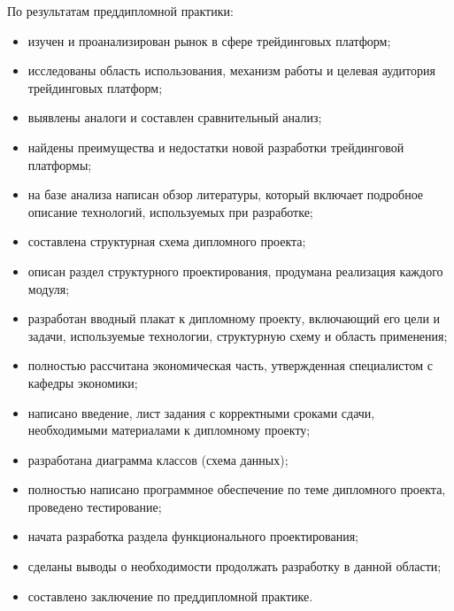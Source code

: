 \label{sec:outro}

По результатам преддипломной практики:
\begin{itemize}
    \item изучен и проанализирован рынок в сфере трейдинговых платформ;
    \item исследованы область использования, механизм работы и целевая аудитория трейдинговых платформ;
    \item выявлены аналоги и составлен сравнительный анализ;
    \item найдены преимущества и недостатки новой разработки трейдинговой платформы;
    \item на базе анализа написан обзор литературы, который включает подробное описание технологий, используемых при разработке;
    \item составлена структурная схема дипломного проекта;
    \item описан раздел структурного проектирования, продумана реализация каждого модуля;
    \item разработан вводный плакат к дипломному проекту, включающий его цели и задачи, используемые технологии, структурную схему и область применения;
    \item полностью рассчитана экономическая часть, утвержденная специалистом с кафедры экономики;
    \item написано введение, лист задания с корректными сроками сдачи, необходимыми материалами к дипломному проекту;
    \item разработана диаграмма классов (схема данных);
    \item полностью написано программное обеспечение по теме дипломного проекта, проведено тестирование;
    \item начата разработка раздела функционального проектирования;
    \item сделаны выводы о необходимости продолжать разработку в данной области;
    \item составлено заключение по преддипломной практике.
\end{itemize}
